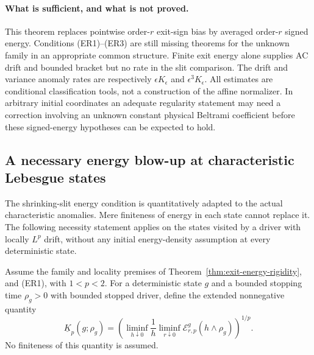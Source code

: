 \documentclass[11pt]{article}
\theoremstyle{definition}\newtheorem{definition}[theorem]{Definition}
\theoremstyle{remark}\newtheorem{remark}[theorem]{Remark}
\begin{document}
\paragraph{What is sufficient, and what is not proved.}
This theorem replaces pointwise order-$r$ exit-sign bias by averaged
order-$r$ signed energy.  Conditions (ER1)--(ER3) are still missing
theorems for the unknown family in an appropriate common structure.
Finite exit energy alone supplies AC drift and bounded bracket but no
rate in the slit comparison. The drift and variance anomaly rates are
respectively $\epsilon K_\epsilon$ and $\epsilon^3K_\epsilon$.
All estimates are conditional classification tools, not a construction
of the affine normalizer. In arbitrary initial coordinates an adequate
regularity statement may need a correction involving an unknown constant
physical Beltrami coefficient before these signed-energy hypotheses can
be expected to hold.


\subsection{A necessary energy blow-up at characteristic Lebesgue states}
\label{sec:visited-energy-necessity}

The shrinking-slit energy condition is quantitatively adapted to the
actual characteristic anomalies. Mere finiteness of energy in each
state cannot replace it. The following necessity statement applies on
the states visited by a driver with locally $L^p$ drift, without any
initial energy-density assumption at every deterministic state.

Assume the family and locality premises of
Theorem~\ref{thm:exit-energy-rigidity}, and (ER1), with $1<p<2$.
For a deterministic state $g$ and a bounded stopping time $\rho_g>0$
with bounded stopped driver, define the extended nonnegative quantity
\[
 \underline K_p(g;\rho_g)=
 \left(\liminf_{h\downarrow0}\frac1h
       \liminf_{r\downarrow0}
          \mathcal E^g_{r,p}(h\wedge\rho_g)\right)^{1/p}.
 \tag{VN1}
\]
No finiteness of this quantity is assumed.
\end{document}
